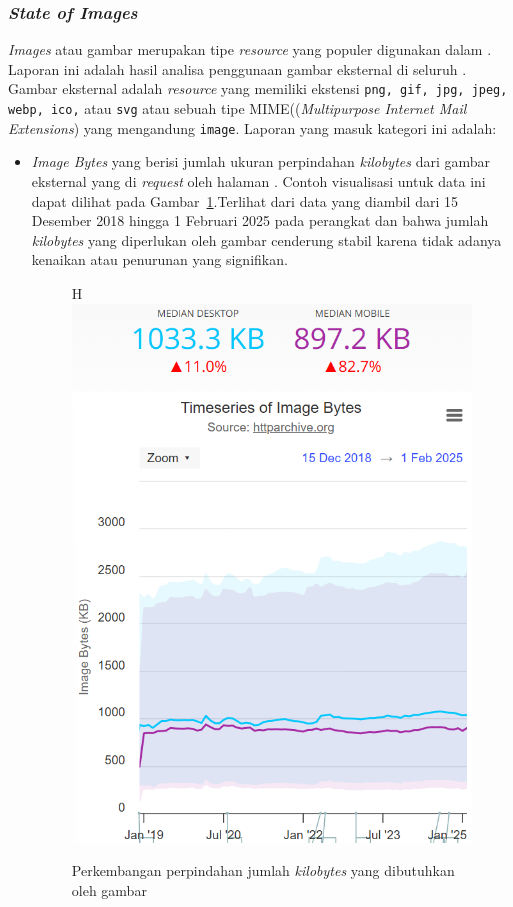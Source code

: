 \subsubsection{\textit{State of Images}}

\textit{Images} atau gambar merupakan tipe \textit{resource} yang populer digunakan dalam \web. Laporan ini adalah hasil analisa penggunaan gambar eksternal di seluruh \web. Gambar eksternal adalah \textit{resource} yang memiliki ekstensi \verb|png, gif, jpg, jpeg, webp, ico,| atau \verb|svg| atau sebuah tipe MIME((\textit{Multipurpose Internet Mail Extensions}) yang mengandung \verb|image|. Laporan yang masuk kategori ini adalah:
\begin{itemize}
    \item \textit{Image Bytes} yang berisi jumlah ukuran perpindahan \textit{kilobytes} dari gambar eksternal yang di \textit{request} oleh halaman \web. Contoh visualisasi untuk data ini dapat dilihat pada Gambar~\ref{fig:imagesbyte}.Terlihat dari data yang diambil dari 15 Desember 2018 hingga 1 Februari 2025 pada perangkat \desktop dan \mobile bahwa jumlah \textit{kilobytes} yang diperlukan oleh gambar cenderung stabil karena tidak adanya kenaikan atau penurunan yang signifikan.
    \begin{figure}{H}
        \centering
        \includegraphics[width=0.4\linewidth]{Gambar/Contoh Image Bytes.png}
        \caption{Perkembangan perpindahan jumlah \textit{kilobytes} yang dibutuhkan oleh gambar}
        \label{fig:imagesbyte}
    \end{figure}


\end{itemize}
